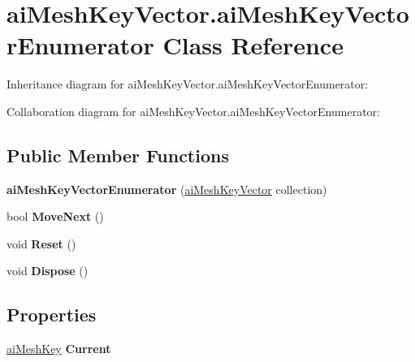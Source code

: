 \hypertarget{classai_mesh_key_vector_1_1ai_mesh_key_vector_enumerator}{\section{ai\+Mesh\+Key\+Vector.\+ai\+Mesh\+Key\+Vector\+Enumerator Class Reference}
\label{classai_mesh_key_vector_1_1ai_mesh_key_vector_enumerator}
}


Inheritance diagram for ai\+Mesh\+Key\+Vector.\+ai\+Mesh\+Key\+Vector\+Enumerator\+:


Collaboration diagram for ai\+Mesh\+Key\+Vector.\+ai\+Mesh\+Key\+Vector\+Enumerator\+:
\subsection*{Public Member Functions}
\begin{DoxyCompactItemize}
\item 
\hypertarget{classai_mesh_key_vector_1_1ai_mesh_key_vector_enumerator_a97a81207f23e39af1419bc3cdb83ec40}{{\bfseries ai\+Mesh\+Key\+Vector\+Enumerator} (\hyperlink{classai_mesh_key_vector}{ai\+Mesh\+Key\+Vector} collection)}\label{classai_mesh_key_vector_1_1ai_mesh_key_vector_enumerator_a97a81207f23e39af1419bc3cdb83ec40}

\item 
\hypertarget{classai_mesh_key_vector_1_1ai_mesh_key_vector_enumerator_a032a40db63247a0c212cf6bc2bd1669a}{bool {\bfseries Move\+Next} ()}\label{classai_mesh_key_vector_1_1ai_mesh_key_vector_enumerator_a032a40db63247a0c212cf6bc2bd1669a}

\item 
\hypertarget{classai_mesh_key_vector_1_1ai_mesh_key_vector_enumerator_aba1a8b86647033a4aab25a282bc4e92d}{void {\bfseries Reset} ()}\label{classai_mesh_key_vector_1_1ai_mesh_key_vector_enumerator_aba1a8b86647033a4aab25a282bc4e92d}

\item 
\hypertarget{classai_mesh_key_vector_1_1ai_mesh_key_vector_enumerator_aa8188c083e64e2e216706c9f7222c5ea}{void {\bfseries Dispose} ()}\label{classai_mesh_key_vector_1_1ai_mesh_key_vector_enumerator_aa8188c083e64e2e216706c9f7222c5ea}

\end{DoxyCompactItemize}
\subsection*{Properties}
\begin{DoxyCompactItemize}
\item 
\hypertarget{classai_mesh_key_vector_1_1ai_mesh_key_vector_enumerator_a4254eb1178466c8d12f26643fcee17a2}{\hyperlink{structai_mesh_key}{ai\+Mesh\+Key} {\bfseries Current}}\label{classai_mesh_key_vector_1_1ai_mesh_key_vector_enumerator_a4254eb1178466c8d12f26643fcee17a2}

\end{DoxyCompactItemize}



